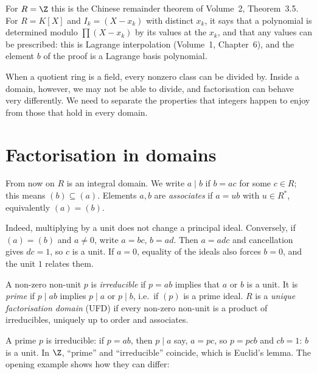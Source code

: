 For $R=\Z$ this is the Chinese remainder theorem of Volume~2, Theorem~3.5. For $R=K[X]$ and $I_k=(X-x_k)$ with distinct $x_k$, it says that a polynomial is determined modulo $\prod(X-x_k)$ by its values at the $x_k$, and that any values can be prescribed: this is Lagrange interpolation (Volume~1, Chapter~6), and the element $b$ of the proof is a Lagrange basis polynomial.

When a quotient ring is a field, every nonzero class can be divided by. Inside a domain, however, we may not be able to divide, and factorisation can behave very differently. We need to separate the properties that integers happen to enjoy from those that hold in every domain.

\section{Factorisation in domains}

From now on $R$ is an integral domain. We write $a\mid b$ if $b=ac$ for some $c\in R$; this means $(b)\subseteq(a)$. Elements $a,b$ are \emph{associates} if $a=ub$ with $u\in R^*$, equivalently $(a)=(b)$.

Indeed, multiplying by a unit does not change a principal ideal.
Conversely, if $(a)=(b)$ and $a\ne0$, write $a=bc$, $b=ad$.
Then $a=adc$ and cancellation gives $dc=1$, so $c$ is a unit.
If $a=0$, equality of the ideals also forces $b=0$, and the unit $1$
relates them.

\begin{definition}
A non-zero non-unit $p$ is \emph{irreducible} if $p=ab$ implies that $a$ or $b$ is a unit. It is \emph{prime} if $p\mid ab$ implies $p\mid a$ or $p\mid b$, i.e.\ if $(p)$ is a prime ideal. $R$ is a \emph{unique factorisation domain} (UFD) if every non-zero non-unit is a product of irreducibles, uniquely up to order and associates.
\end{definition}

A prime $p$ is irreducible: if $p=ab$, then $p\mid a$ say, $a=pc$, so $p=pcb$ and $cb=1$: $b$ is a unit. In $\Z$, ``prime'' and ``irreducible'' coincide, which is Euclid's lemma. The opening example shows how they can differ:

